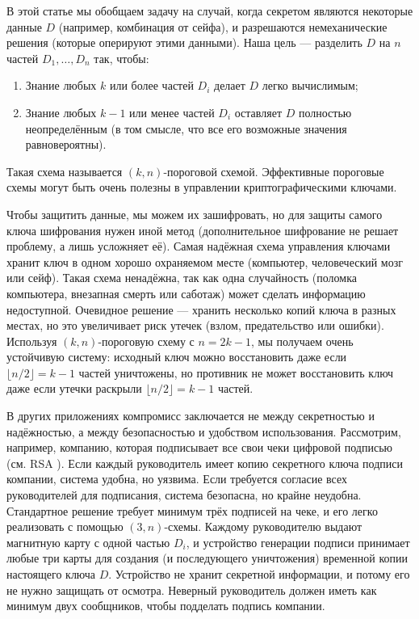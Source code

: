 \documentclass[a4paper,12pt]{article}
\begin{document}
В этой статье мы обобщаем задачу на случай, когда секретом являются
некоторые данные $D$ (например, комбинация от сейфа), и разрешаются
немеханические решения (которые оперируют этими данными).
Наша цель --- разделить $D$ на $n$ частей $D_1, \ldots, D_n$ так, чтобы:

\begin{enumerate}
\item Знание любых $k$ или более частей $D_i$ делает $D$ легко вычислимым;
\item Знание любых $k-1$ или менее частей $D_i$ оставляет $D$ полностью
неопределённым (в том смысле, что все его возможные значения равновероятны).
\end{enumerate}

Такая схема называется $(k,n)$-пороговой схемой.
Эффективные пороговые схемы могут быть очень полезны в управлении
криптографическими ключами.

Чтобы защитить данные, мы можем их зашифровать, но для защиты самого
ключа шифрования нужен иной метод (дополнительное шифрование не решает проблему,
а лишь усложняет её). Самая надёжная схема управления ключами хранит ключ в одном
хорошо охраняемом месте (компьютер, человеческий мозг или сейф). Такая схема
ненадёжна, так как одна случайность (поломка компьютера, внезапная смерть или
саботаж) может сделать информацию недоступной. Очевидное решение --- хранить
несколько копий ключа в разных местах, но это увеличивает риск утечек
(взлом, предательство или ошибки). Используя $(k,n)$-пороговую схему с $n = 2k-1$,
мы получаем очень устойчивую систему: исходный ключ можно восстановить даже если
$\lfloor n/2 \rfloor = k-1$ частей уничтожены, но противник не может восстановить
ключ даже если утечки раскрыли $\lfloor n/2 \rfloor = k-1$ частей.

В других приложениях компромисс заключается не между секретностью и надёжностью,
а между безопасностью и удобством использования. Рассмотрим, например, компанию,
которая подписывает все свои чеки цифровой подписью (см. RSA \cite{rsa1978}).
Если каждый руководитель имеет копию секретного ключа подписи компании,
система удобна, но уязвима. Если требуется согласие всех руководителей для
подписания, система безопасна, но крайне неудобна. Стандартное решение требует
минимум трёх подписей на чеке, и его легко реализовать с помощью $(3,n)$-схемы.
Каждому руководителю выдают магнитную карту с одной частью $D_i$, и устройство
генерации подписи принимает любые три карты для создания (и последующего уничтожения)
временной копии настоящего ключа $D$. Устройство не хранит секретной информации,
и потому его не нужно защищать от осмотра. Неверный руководитель должен иметь
как минимум двух сообщников, чтобы подделать подпись компании.
\end{document}
